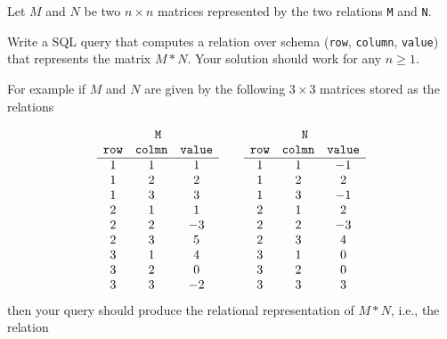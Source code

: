\documentclass{article}
\begin{document}
\begin{enumerate}[resume]
Let $M$ and $N$ be two $n\times n$ matrices represented by the two relations {\tt M} and {\tt N}.

Write a SQL query that computes a relation over schema ({\tt row}, {\tt column}, {\tt value}) that represents
the matrix $M * N$. 
Your solution should work for any $n\geq 1$.

For example if $M$ and $N$ are given by the following $3\times 3$ matrices stored as the relations

\[
\begin{array}{ccc}
\begin{array}{c}
{\tt M} \\ 
 \begin{array}{ccc}
 {\tt row} & {\tt colmn} & {\tt value} \\ \hline
1 & 1 & 1 \\
1 & 2 & 2 \\
1 & 3 & 3 \\
2 & 1 & 1 \\
2 & 2 & -3 \\
2 & 3 & 5 \\
3 & 1 & 4 \\
3 & 2 & 0\\
3 & 3 & -2 \\
 \end{array}
\end{array}
&
\begin{array}{c}
{\tt N} \\ 
 \begin{array}{ccc}
 {\tt row} & {\tt colmn} & {\tt value} \\ \hline
1 & 1 & -1 \\
1 & 2 & 2 \\
1 & 3 & -1 \\
2 & 1 & 2\\
2 & 2 & -3 \\
2 & 3 & 4 \\
3 & 1 & 0 \\
3 & 2 & 0\\
3 & 3 & 3 \\
 \end{array}
\end{array}
\end{array}
\]
%
then your query should produce the relational representation of $M * N$, i.e., the relation


\end{enumerate}
\end{document}
